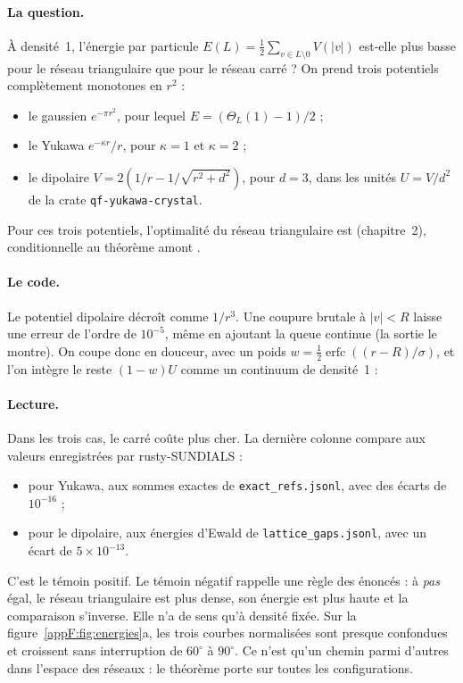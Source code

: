 \paragraph{La question.} À densité~1, l'énergie par particule $E(L)=\tfrac12\sum_{v\in L\setminus0}V(|v|)$ est-elle plus
basse pour le réseau triangulaire que pour le réseau carré ? On prend trois potentiels complètement monotones en $r^2$ :
\begin{itemize}
\item le gaussien $e^{-\pi r^2}$, pour lequel $E=(\Theta_L(1)-1)/2$ ;
\item le Yukawa $e^{-\kappa r}/r$, pour $\kappa=1$ et $\kappa=2$ ;
\item le dipolaire $V=2(1/r-1/\sqrt{r^2+d^2})$, pour $d=3$, dans les unités $U=V/d^2$ de la crate
\texttt{qf-yukawa-crystal}.
\end{itemize}
Pour ces trois potentiels, l'optimalité du réseau triangulaire est \tierA{} (chapitre~2), conditionnelle au théorème
amont .

\paragraph{Le code.} Le potentiel dipolaire décroît comme $1/r^3$. Une coupure brutale à $|v|<R$ laisse une erreur de
l'ordre de $10^{-5}$, même en ajoutant la queue continue (la sortie le montre). On coupe donc en douceur, avec un
poids $w=\tfrac12\operatorname{erfc}((r-R)/\sigma)$, et l'on intègre le reste $(1-w)U$ comme un continuum de densité~1 :


\paragraph{Lecture.} Dans les trois cas, le carré coûte plus cher. La dernière colonne compare aux valeurs
enregistrées par rusty-SUNDIALS :
\begin{itemize}
\item pour Yukawa, aux sommes exactes de \texttt{exact\_refs.jsonl}, avec des écarts de $10^{-16}$ ;
\item pour le dipolaire, aux énergies d'Ewald de \texttt{lattice\_gaps.jsonl}, avec un écart de $5\times10^{-13}$.
\end{itemize}
C'est le témoin positif. Le témoin négatif rappelle une règle des énoncés : à \emph{pas} égal, le réseau triangulaire
est plus dense, son énergie est plus haute et la comparaison s'inverse. Elle n'a de sens qu'à densité fixée.
Sur la figure~\ref{appF:fig:energies}a, les trois courbes normalisées sont presque confondues et croissent sans
interruption de $60^\circ$ à $90^\circ$. Ce n'est qu'un chemin parmi d'autres dans l'espace des réseaux : le théorème
porte sur toutes les configurations.

